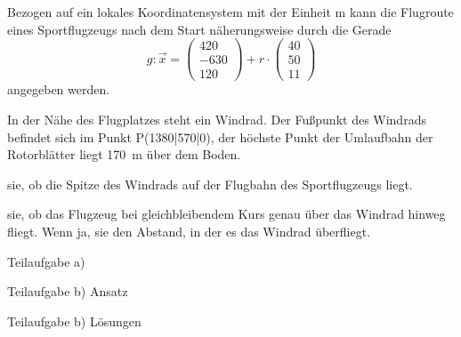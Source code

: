 \documentclass[11pt, a5paper, landscape]{scrartcl}
\begin{document}
	\begin{aufgabe}
		Bezogen auf ein lokales Koordinatensystem mit der Einheit \si{\meter} kann die Flugroute eines Sportflugzeugs nach dem Start näherungsweise durch die Gerade
		\[ g: \vec{x} = \begin{pmatrix} 420 \\ -630 \\ 120 \end{pmatrix} + r\cdot \begin{pmatrix} 40 \\ 50 \\ 11 \end{pmatrix}\]
		angegeben werden.
		
		In der Nähe des Flugplatzes steht ein Windrad. Der Fußpunkt des Windrads befindet sich im Punkt P\pkt(1380|570|0), der höchste Punkt der Umlaufbahn der Rotorblätter liegt \SI{170}{\meter} über dem Boden.
		
		\begin{teilaufgaben}
			\teilaufgabe {} sie, ob die Spitze des Windrads auf der Flugbahn des Sportflugzeugs liegt.
		 
			\teilaufgabe {} sie, ob das Flugzeug bei gleichbleibendem Kurs genau über das Windrad hinweg fliegt. Wenn ja,  sie den Abstand, in der es das Windrad überfliegt.
		\end{teilaufgaben}
	\end{aufgabe}
	\clearpage
	
	\begin{center}
		\begin{multicols}{3}
			Teilaufgabe a)\\
			\columnbreak
			
			Teilaufgabe b) Ansatz\\
			\columnbreak
			
			Teilaufgabe b) Lösungen\\
		\end{multicols}
	\end{center}
	\clearpage
	
\end{document}
